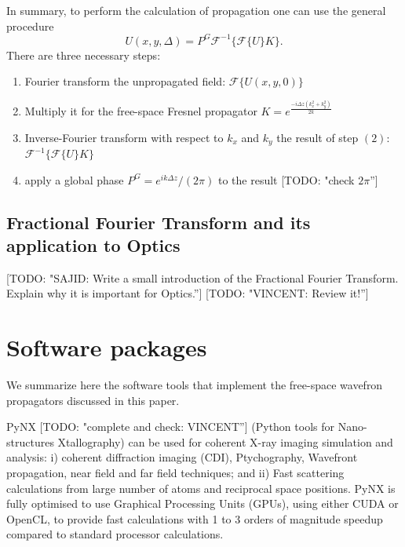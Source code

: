 \documentclass{iucr}              %
\newcommand{\todo}[1]{{\color{red}[TODO: "#1'']}}
\begin{document}
In summary, to perform the calculation of propagation one can use the general procedure
\begin{equation}
\label{eq: Fresnel propagation in convolution form}
U(x, y, \Delta) = P^G \mathcal{F}^{-1}\Big\{\mathcal{F}\big\{U \big\} K \Big\}.
\end{equation}
There are three necessary steps: 
\begin{enumerate}
	\item Fourier transform the unpropagated field: $\mathcal{F}\big\{U(x,y,0)\big\}$
	\item Multiply it for the free-space Fresnel propagator $ K=e^{\frac{-i \Delta z (k_x^2 + k_y^2) }{2k}}$
	\item Inverse-Fourier transform with respect to $k_x$ and $k_y$ the result of step $(2)$: $\mathcal{F}^{-1}\Big\{\mathcal{F}\big\{U \big\} K \Big\}$
	\item apply a global phase $P^G = {e^{ik\Delta z}}/(2 \pi)$ to the result \todo{check $2 \pi$}
\end{enumerate}




\subsection{Fractional Fourier Transform and its application to Optics}

\todo{SAJID: Write a small introduction of the Fractional Fourier Transform. Explain why it is important for Optics.}
\todo{VINCENT: Review it!}


\section{Software packages}
\label{ch: packages}

We summarize here the software tools that implement the free-space wavefron propagators discussed in this paper. 

PyNX \todo{complete and check: VINCENT} \cite{Favre-Nicolin:hx5119} (Python tools for Nano-structures Xtallography) can be used for coherent X-ray imaging simulation and analysis: i) coherent diffraction imaging (CDI), Ptychography, Wavefront propagation, near field and far field techniques; and ii) Fast scattering calculations from large number of atoms and reciprocal space positions. PyNX is fully optimised to use Graphical Processing Units (GPUs), using either CUDA or OpenCL, to provide fast calculations with 1 to 3 orders of magnitude speedup compared to standard processor calculations.
\end{document}
